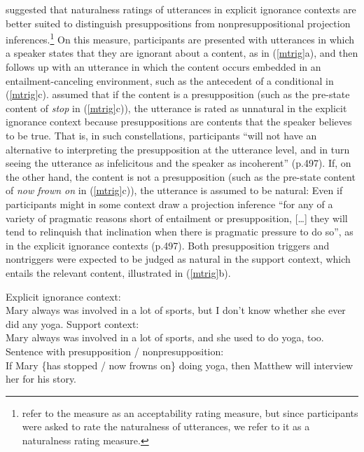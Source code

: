 \documentclass[11pt,fleqn]{article}
\newcommand{\6}{\mbox{$[\hspace*{-.6mm}[$}}
\newcommand{\9}{\mbox{$]\hspace*{-.6mm}]$}}
\begin{document}
\citealt[\S6.2]{mandelkern-etal2020} suggested that naturalness ratings of utterances in explicit ignorance contexts are better suited to distinguish presuppositions from nonpresuppositional projection inferences.\footnote{\citealt{mandelkern-etal2020} refer to the measure as an acceptability rating measure, but since participants were asked to rate the naturalness of utterances, we refer to it as a naturalness rating measure.} On this measure, participants are presented with utterances in which a speaker states that they are ignorant about a content, as in (\ref{mtrig}a), and then follows up with an utterance in which the content occurs embedded in an entailment-canceling environment, such as the antecedent of a conditional in (\ref{mtrig}c). \citealt{mandelkern-etal2020} assumed that if the content is a presupposition (such as the pre-state content of {\em stop} in (\ref{mtrig}c)), the utterance is rated as unnatural in the explicit ignorance context because presuppositions are contents that the speaker believes to be true. That is, in such constellations,  participants ``will not have an alternative to interpreting the presupposition at the utterance level, and in turn seeing the utterance as infelicitous and the speaker as incoherent'' (p.497).  If, on the other hand, the content is not a presupposition (such as the pre-state content of {\em now frown on} in (\ref{mtrig}c)), the utterance is assumed to be natural: Even if participants might in some context draw a projection inference ``for any of a variety of pragmatic reasons short of entailment or presupposition, [\ldots] they will tend to relinquish that inclination when there is pragmatic pressure to do so'', as in the explicit ignorance contexts (p.497). Both presupposition triggers and nontriggers were expected to be judged as natural in the support context, which entails the relevant content, illustrated in (\ref{mtrig}b).

\begin{exe}
\ex\label{mtrig} \citealt[490f.]{mandelkern-etal2020}
\begin{xlist}
\ex Explicit ignorance context: \\ Mary always was involved in a lot of sports, but I don't know whether she ever did any yoga.
\ex Support context: \\ Mary always was involved in a lot of sports, and she used to do yoga, too.
\ex Sentence with presupposition / nonpresupposition: \\ If Mary \{has stopped / now frowns on\} doing yoga, then Matthew will interview her for his story.
\end{xlist}
\end{exe}
\end{document}

